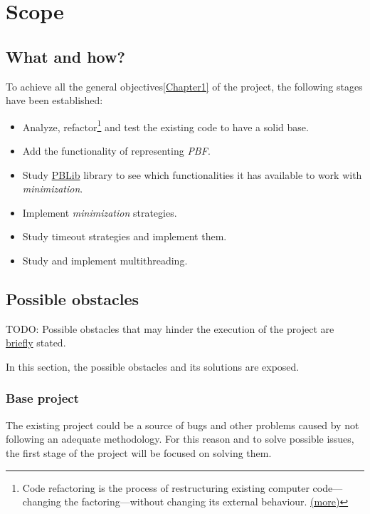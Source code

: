 
\chapter{Scope} %

\label{Chapter2} %

\section{What and how?}

To achieve all the general objectives\ref{Chapter1} of the project, the following stages have been established:
\begin{itemize}
	\item Analyze, refactor\footnote{Code refactoring is the process of restructuring existing computer code—changing the factoring—without changing its external behaviour. \href{https://en.wikipedia.org/wiki/Code_refactoring}{(more)}} and test the existing code to have a solid base. 
	\item Add the functionality of representing \emph{PBF}.
	\item Study \href{http://tools.computational-logic.org/content/pblib.php}{PBLib} library to see which functionalities it has available to work with \emph{minimization}.
	\item Implement \emph{minimization} strategies.
	\item Study timeout strategies and implement them.
	\item Study and implement multithreading.
\end{itemize}

\section{Possible obstacles}

TODO: Possible obstacles that
may hinder the execution of the
project are \underline{briefly} stated.


In this section, the possible obstacles and its solutions are exposed.

\subsection{Base project}
The existing project could be a source of bugs and other problems caused by not following an adequate methodology. For this reason and to solve possible issues, the first stage of the project will be focused on solving them.
